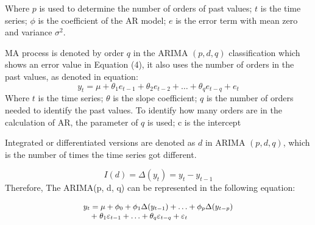 \documentclass[twocolumn]{llncs}
\begin{document}
\noindent Where $p$ is used to determine the number of orders of past values; $t$ is the time series; $\phi$ is the coefficient of the AR model; $e$ is the error term with mean zero and variance $\sigma^2$.

\noindent MA process is denoted by order $q$ in the ARIMA $(p, d, q)$ classification which shows an error value in Equation (4), it also uses the number of orders in the past values, as denoted in equation:
\begin{equation}
y_t = \mu +\theta_1 e_{t-1} + \theta_2 e_{t-2} + \ldots + \theta_q e_{t-q} + e_t
\end{equation}
Where $t$ is the time series; $\theta$ is the slope coefficient; $q$ is the number of orders needed to identify the past values. To identify how many orders are in the calculation of AR, the parameter of $q$ is used; c is the intercept

\noindent Integrated or differentiated versions are denoted as $d$ in ARIMA $(p, d, q)$, which is the number of times the time series got different.

\begin{equation}
I(d) = \Delta(y_t) = y_t - y_{t-1}
\end{equation}
Therefore, The ARIMA(p, d, q) can be represented in the following equation:

\begin{equation}
\small
\begin{array}{l}
y_t = \mu + \phi_0 + \phi_1\Delta(y_{t-1}) + \ldots + \phi_p\Delta( y_{t-p}) \\
\quad +\; \theta_1 \varepsilon_{t-1} + \ldots + \theta_q \varepsilon_{t-q} + \varepsilon_t
\end{array}
\end{equation}


\end{document}
